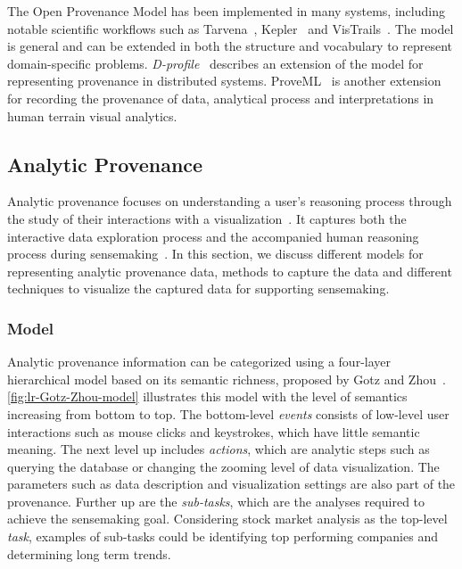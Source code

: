 The Open Provenance Model has been implemented in many systems, including notable scientific workflows such as Tarvena~\cite{Zhao2008}, Kepler~\cite{Bowers2006} and VisTrails~\cite{Bavoil2005}. The model is general and can be extended in both the structure and vocabulary to represent domain-specific problems. \emph{D-profile}~\cite{Groth2011} describes an extension of the model for representing provenance in distributed systems. ProveML~\cite{Walker2013} is another extension for recording the provenance of data, analytical process and interpretations in human terrain visual analytics.


\subsection{Analytic Provenance}
\label{sec:lr-analytic-provenance}
Analytic provenance focuses on understanding a user's reasoning process through the study of their interactions with a visualization~\cite{North2011}. It captures both the interactive data exploration process and the accompanied human reasoning process during sensemaking~\cite{Xu2015}. In this section, we discuss different models for representing analytic provenance data, methods to capture the data and different techniques to visualize the captured data for supporting sensemaking.

\subsubsection{Model}
Analytic provenance information can be categorized using a four-layer hierarchical model based on its semantic richness, proposed by Gotz and Zhou~\cite{Gotz2009}. \autoref{fig:lr-Gotz-Zhou-model} illustrates this model with the level of semantics increasing from bottom to top. The bottom-level \emph{events} consists of low-level user interactions such as mouse clicks and keystrokes, which have little semantic meaning. The next level up includes \emph{actions}, which are analytic steps such as querying the database or changing the zooming level of data visualization. The parameters such as data description and visualization settings are also part of the provenance. Further up are the \emph{sub-tasks}, which are the analyses required to achieve the sensemaking goal. Considering stock market analysis as the top-level \emph{task}, examples of sub-tasks could be identifying top performing companies and determining long term trends. 

